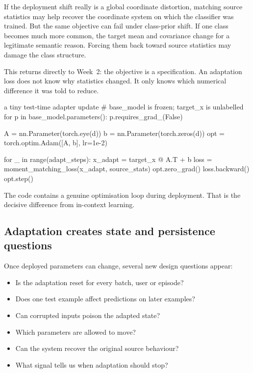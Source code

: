 If the deployment shift really is a global coordinate distortion, matching source statistics may help recover the coordinate system on which the classifier was trained. But the same objective can fail under class-prior shift. If one class becomes much more common, the target mean and covariance change for a legitimate semantic reason. Forcing them back toward source statistics may damage the class structure.

This returns directly to Week~2: the objective is a specification. An adaptation loss does not know why statistics changed. It only knows which numerical difference it was told to reduce.

\begin{pytorchbox}{a tiny test-time adapter update}
# base_model is frozen; target_x is unlabelled
for p in base_model.parameters():
    p.requires_grad_(False)

A = nn.Parameter(torch.eye(d))
b = nn.Parameter(torch.zeros(d))
opt = torch.optim.Adam([A, b], lr=1e-2)

for _ in range(adapt_steps):
    x_adapt = target_x @ A.T + b
    loss = moment_matching_loss(x_adapt, source_stats)
    opt.zero_grad()
    loss.backward()
    opt.step()
\end{pytorchbox}

The code contains a genuine optimisation loop during deployment. That is the decisive difference from in-context learning.

\subsection{Adaptation creates state and persistence questions}

Once deployed parameters can change, several new design questions appear:
\begin{itemize}[leftmargin=*]
  \item Is the adaptation reset for every batch, user or episode?
  \item Does one test example affect predictions on later examples?
  \item Can corrupted inputs poison the adapted state?
  \item Which parameters are allowed to move?
  \item Can the system recover the original source behaviour?
  \item What signal tells us when adaptation should stop?
\end{itemize}

